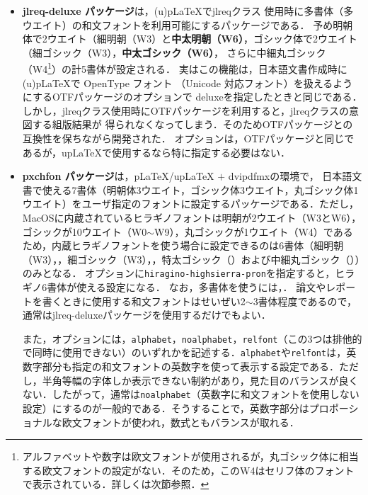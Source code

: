 \begin{itemize}
\item{\sffamily\bfseries jlreq-deluxe パッケージ}は，(u)p{\LaTeX}でjlreqクラス
使用時に多書体（多ウエイト）の和文フォントを利用可能にするパッケージである\cite{jlreq-deluxe}．
予め明朝体で2ウエイト（細明朝（W3）と{\bfseries 中太明朝（W6）}，ゴシック体で2ウエイト（{\sffamily 細ゴシック（W3）}，{\sffamily\bfseries 中太ゴシック（W6）}，
さらに{\mgfamily 中細丸ゴシック（W4\footnote{アルファベットや数字は欧文フォントが使用されるが，丸ゴシック体に相当する欧文フォントの設定がない．そのため，このW4はセリフ体のフォントで表示されている．詳しくは次節参照．}）}の計5書体が設定される．
実はこの機能は，日本語文書作成時に(u)p{\LaTeX}で OpenType フォント
（Unicode 対応フォント）を扱えるようにするOTFパッケージ\cite{OTF}のオプションで
deluxeを指定したときと同じである．
しかし，jlreqクラス使用時にOTFパッケージを利用すると，jlreqクラスの意図する組版結果が
得られなくなってしまう．そのためOTFパッケージとの互換性を保ちながら開発された．
オプションは，OTFパッケージと同じであるが，up{\LaTeX}で使用するなら特に指定する必要はない．

\item{\sffamily\bfseries pxchfon パッケージ}は，{p\LaTeX}/{up\LaTeX} $+$ dvipdfmxの環境で，
日本語文書で使える7書体（明朝体3ウエイト，ゴシック体3ウエイト，丸ゴシック体1ウエイト）をユーザ指定のフォントに設定するパッケージである\cite{pxchfon}．ただし，MacOSに内蔵されているヒラギノフォントは明朝が2ウエイト（W3とW6），ゴシックが10ウエイト（W0$\sim$W9），丸ゴシックが1ウエイト（W4）であるため，内蔵ヒラギノフォントを使う場合に設定できるのは6書体（細明朝（W3），，{\sffamily 細ゴシック（W3）}，，{\gtfamily\ebseries 特太ゴシック（）}および{\mgfamily 中細丸ゴシック（）}）のみとなる．
オプションに\texttt{hiragino-highsierra-pron}を指定すると，ヒラギノ6書体が使える設定になる．
なお，多書体を使うには，．
論文やレポートを書くときに使用する和文フォントはせいぜい2$\sim$3書体程度であるので，通常はjlreq-deluxeパッケージを使用するだけでもよい．

また，オプションには，\texttt{alphabet}，\texttt{noalphabet}，\texttt{relfont}（この3つは排他的で同時に使用できない）のいずれかを記述する．\texttt{alphabet}や\texttt{relfont}は，英数字部分も指定の和文フォントの英数字を使って表示する設定である．ただし，半角等幅の字体しか表示できない制約があり，見た目のバランスが良くない．したがって，通常は\texttt{noalphabet}（英数字に和文フォントを使用しない設定）にするのが一般的である．そうすることで，英数字部分はプロポーショナルな欧文フォントが使われ，数式ともバランスが取れる．


\end{itemize}
